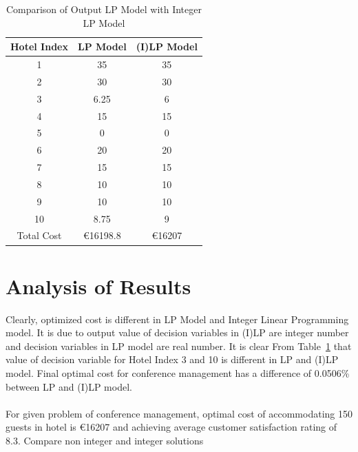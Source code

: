 \documentclass[paper=a4, fontsize=11pt]{scrartcl} %
\begin{document}
\begin{table}[!h]
\centering
\begin{tabular}{@{}ccc@{}}
\toprule
\textbf{Hotel Index}     & \textbf{LP Model}         & \textbf{(I)LP Model}    \\ \midrule
\multicolumn{1}{|c|}{1}  & \multicolumn{1}{c|}{35}   & \multicolumn{1}{c|}{35} \\ \midrule
\multicolumn{1}{|c|}{2}  & \multicolumn{1}{c|}{30}   & \multicolumn{1}{c|}{30} \\ \midrule
\multicolumn{1}{|c|}{3}  & \multicolumn{1}{c|}{6.25} & \multicolumn{1}{c|}{6}  \\ \midrule
\multicolumn{1}{|c|}{4}  & \multicolumn{1}{c|}{15}   & \multicolumn{1}{c|}{15} \\ \midrule
\multicolumn{1}{|c|}{5}  & \multicolumn{1}{c|}{0}    & \multicolumn{1}{c|}{0}  \\ \midrule
\multicolumn{1}{|c|}{6}  & \multicolumn{1}{c|}{20}   & \multicolumn{1}{c|}{20} \\ \midrule
\multicolumn{1}{|c|}{7}  & \multicolumn{1}{c|}{15}   & \multicolumn{1}{c|}{15} \\ \midrule
\multicolumn{1}{|c|}{8}  & \multicolumn{1}{c|}{10}   & \multicolumn{1}{c|}{10} \\ \midrule
\multicolumn{1}{|c|}{9}  & \multicolumn{1}{c|}{10}   & \multicolumn{1}{c|}{10} \\ \midrule
\multicolumn{1}{|c|}{10} & \multicolumn{1}{c|}{8.75} & \multicolumn{1}{c|}{9}  \\ \midrule
\multicolumn{1}{|c|}{Total Cost} & \multicolumn{1}{c|}{\euro 16198.8} & \multicolumn{1}{c|}{\euro 16207}  \\ \midrule
\end{tabular}
\caption{Comparison of Output LP Model with Integer LP Model}
\label{tab:ilpmodel}
\end{table}


\section{Analysis of Results}



Clearly, optimized cost is different in LP Model and Integer Linear Programming model. It is due to output value of decision variables in (I)LP are integer number and decision variables in LP model  are real number. It is clear  From Table~\ref{tab:ilpmodel} that value of decision variable for Hotel Index 3 and 10 is different in LP and (I)LP model. Final optimal cost for conference management has a difference of 0.0506\% between LP and (I)LP model.
\\
\\
For given problem of conference management, optimal cost of accommodating 150 guests in hotel is \euro 16207 and achieving average customer satisfaction rating of 8.3.
Compare non integer and integer solutions
\end{document}
